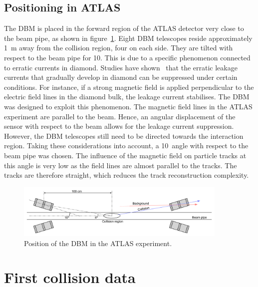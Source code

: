 \subsection{Positioning in ATLAS}
The DBM is placed in the forward region of the ATLAS detector very close to the beam pipe, as shown in figure~\ref{fig:dbminatlas}. Eight DBM telescopes reside approximately 1~m away from the collision region, four on each side. They are tilted with respect to the beam pipe for 10\textdegree. This is due to a specific phenomenon connected to erratic currents in diamond. Studies have shown~\cite{Mueller:1175553} that the erratic leakage currents that gradually develop in diamond can be suppressed under certain conditions. For instance, if a strong magnetic field is applied perpendicular to the electric field lines in the diamond bulk, the leakage current stabilises. The DBM was designed to exploit this phenomenon. The magnetic field lines in the ATLAS experiment are parallel to the beam. Hence, an angular displacement of the sensor with respect to the beam allows for the leakage current suppression. However, the DBM telescopes still need to be directed towards the interaction region. Taking these considerations into account, a 10\textdegree~angle with respect to the beam pipe was chosen. The influence of the magnetic field on particle tracks at this angle is very low as the field lines are almost parallel to the tracks. The tracks are therefore straight, which reduces the track reconstruction complexity.

\begin{figure}[!t]
\centering
\includegraphics[width=0.9\textwidth]{04_charge_monitoring/pics/positioning}
\caption{Position of the DBM in the ATLAS experiment.}
\label{fig:dbminatlas}
\end{figure}



\clearpage
\section{First collision data}
\label{sec:operation}

